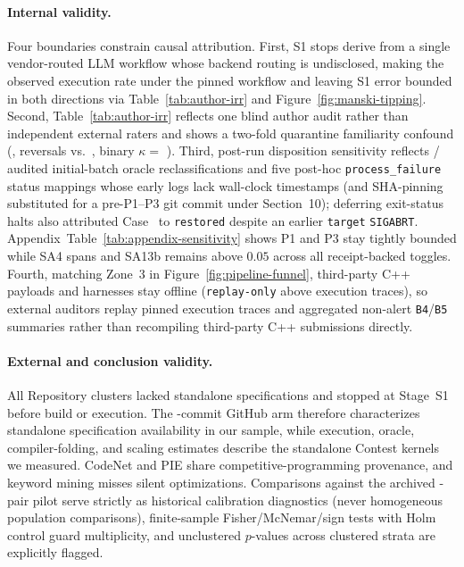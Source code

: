 \documentclass[11pt]{article}
\newcommand{\CaseRef}[1]{Case~#1}
\begin{document}
\paragraph{Internal validity.}
Four boundaries constrain causal attribution.
First, S1 stops derive from a single vendor-routed LLM workflow whose backend routing is undisclosed, making \BenchExecRate{} the observed execution rate under the pinned workflow and leaving S1 error bounded in both directions via Table~\ref{tab:author-irr} and Figure~\ref{fig:manski-tipping}.
Second, Table~\ref{tab:author-irr} reflects one blind author audit rather than independent external raters and shows a two-fold quarantine familiarity confound (\BenchAuthQuarPct{}, \BenchAuthQuarRev{} reversals vs.\ \BenchAuthConfPct{}, binary $\kappa =$ \BenchAuthConfBinK{}).
Third, post-run disposition sensitivity reflects \BenchOracleCoordN{}/\BenchOracleFailN{} audited initial-batch oracle reclassifications and five post-hoc \texttt{process\_failure} status mappings whose early logs lack wall-clock timestamps (and SHA-pinning substituted for a pre-P1--P3 git commit under Section~10); deferring exit-status halts also attributed \CaseRef{\BenchPosTwoSeven{}} to \texttt{restored} despite an earlier \texttt{target} \texttt{SIGABRT}. Appendix~Table~\ref{tab:appendix-sensitivity} shows P1 and P3 stay tightly bounded while SA4 spans \BenchEnvSAFourRange{} and SA13b remains above $0.05$ across all receipt-backed toggles.
Fourth, matching Zone~3 in Figure~\ref{fig:pipeline-funnel}, third-party C++ payloads and harnesses stay offline (\texttt{replay-only} above execution traces), so external auditors replay pinned execution traces and aggregated non-alert \texttt{B4}/\texttt{B5} summaries rather than recompiling third-party C++ submissions directly.

\paragraph{External and conclusion validity.}
All \BenchConfRepoClustersN{} Repository clusters lacked standalone specifications and stopped at Stage~S1 before build or execution.
The \BenchGitHub{}-commit GitHub arm therefore characterizes standalone specification availability in our sample, while execution, oracle, compiler-folding, and scaling estimates describe the standalone Contest kernels we measured.
CodeNet and PIE share competitive-programming provenance, and keyword mining misses silent optimizations.
Comparisons against the archived \BenchPilotPairs{}-pair pilot serve strictly as historical calibration diagnostics (never homogeneous population comparisons), finite-sample Fisher/McNemar/sign tests with Holm control guard multiplicity, and unclustered $p$-values across clustered strata are explicitly flagged.
\end{document}
